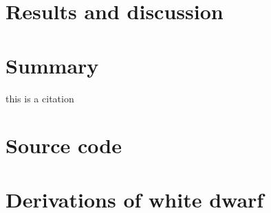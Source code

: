\documentclass[]{article}
\begin{document}
\section{Results and discussion}\label{sec:results-and-discussion}

\section{Summary}\label{sec:summary}
this is a citation \cite{Sagert2005}


\renewcommand{\bibname}{References}


	
	

	
	
	

\appendix
\section{Source code}\label{app:source-code}
\section{Derivations of white dwarf}\label{app:WD-derivations}
\end{document}
